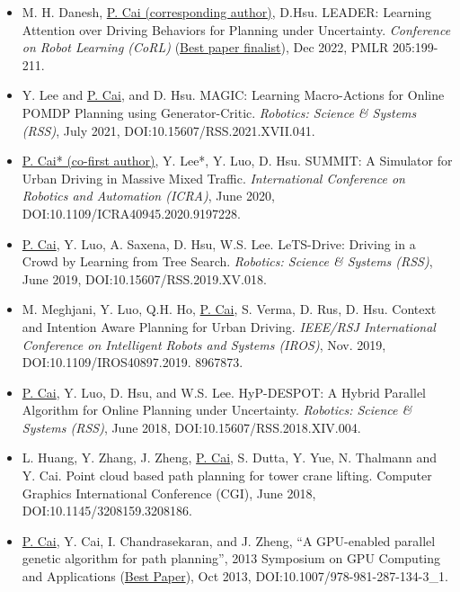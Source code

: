 \documentclass[10pt,letterpaper,sans]{moderncv}        %
\begin{document}
{
\begin{itemize}
\item M. H. Danesh, \underline{P. Cai (corresponding author)}, D.Hsu. LEADER: Learning Attention over Driving Behaviors for Planning under Uncertainty. \textit{Conference on Robot Learning (CoRL)} (\underline{Best paper finalist}), Dec 2022, PMLR 205:199-211. 
\item Y. Lee and \underline{P. Cai}, and D. Hsu. MAGIC: Learning Macro-Actions for Online POMDP Planning using Generator-Critic. \textit{Robotics: Science \& Systems (RSS)}, July 2021, DOI:10.15607/RSS.2021.XVII.041. %
\item \underline{P. Cai* (co-first author)}, Y. Lee*, Y. Luo, D. Hsu. SUMMIT: A Simulator for Urban Driving in Massive Mixed Traffic. \textit{International Conference on Robotics and Automation (ICRA)}, June 2020, DOI:10.1109/ICRA40945.2020.9197228. %
\item \underline{P. Cai}, Y. Luo, A. Saxena, D. Hsu, W.S. Lee. LeTS-Drive: Driving in a Crowd by Learning from Tree Search. \textit{Robotics: Science \& Systems (RSS)}, June 2019, DOI:10.15607/RSS.2019.XV.018. %
\item M. Meghjani, Y. Luo, Q.H. Ho, \underline{P. Cai}, S. Verma,
D. Rus, D. Hsu. Context and Intention Aware Planning for Urban Driving. \textit{IEEE/RSJ International Conference on Intelligent Robots and Systems (IROS)}, Nov. 2019, DOI:10.1109/IROS40897.2019. 8967873. %
\item \underline{P. Cai}, Y. Luo, D. Hsu, and W.S. Lee. HyP-DESPOT: A Hybrid Parallel Algorithm for Online Planning under Uncertainty. \textit{Robotics: Science \& Systems (RSS)}, June 2018, DOI:10.15607/RSS.2018.XIV.004. %
\item L. Huang, Y. Zhang, J. Zheng, \underline{P. Cai}, S. Dutta, Y. Yue, N. Thalmann and Y. Cai. Point cloud based path planning for tower crane lifting. Computer Graphics International Conference (CGI), June 2018, DOI:10.1145/3208159.3208186.
\item \underline{P. Cai}, Y. Cai, I. Chandrasekaran, and J. Zheng, ``A GPU-enabled parallel genetic algorithm for path planning'', 2013 Symposium on GPU Computing and Applications (\underline{Best Paper}), Oct 2013, DOI:10.1007/978-981-287-134-3\_1.
\end{itemize}
}
\end{document}
